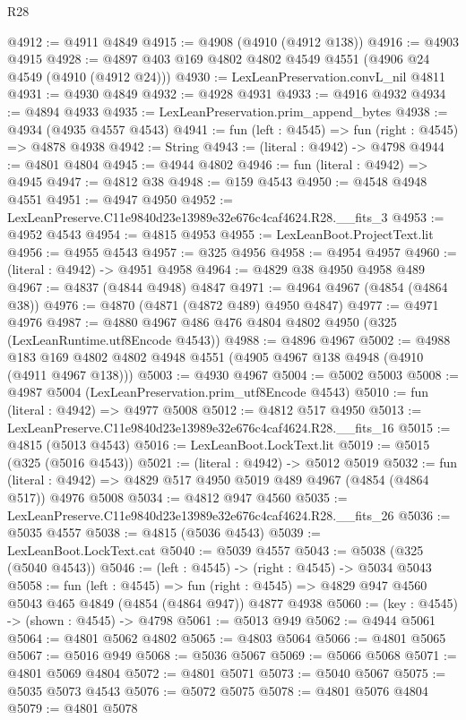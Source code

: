 \begin{lexlean}{R28}
\begin{coremodule}
@4912 := @4911 @4849
@4915 := @4908 (@4910 (@4912 @138))
@4916 := @4903 @4915
@4928 := @4897 @403 @169 @4802 @4802 @4549 @4551 (@4906 @24 @4549 (@4910 (@4912 @24)))
@4930 := LexLeanPreservation.convL_nil @4811
@4931 := @4930 @4849
@4932 := @4928 @4931
@4933 := @4916 @4932
@4934 := @4894 @4933
@4935 := LexLeanPreservation.prim_append_bytes
@4938 := @4934 (@4935 @4557 @4543)
@4941 := fun (left : @4545) => fun (right : @4545) => @4878 @4938
@4942 := String
@4943 := (literal : @4942) -> @4798
@4944 := @4801 @4804
@4945 := @4944 @4802
@4946 := fun (literal : @4942) => @4945
@4947 := @4812 @38
@4948 := @159 @4543
@4950 := @4548 @4948 @4551
@4951 := @4947 @4950
@4952 := LexLeanPreserve.C11e9840d23e13989e32e676c4caf4624.R28.__fits_3
@4953 := @4952 @4543
@4954 := @4815 @4953
@4955 := LexLeanBoot.ProjectText.lit
@4956 := @4955 @4543
@4957 := @325 @4956
@4958 := @4954 @4957
@4960 := (literal : @4942) -> @4951 @4958
@4964 := @4829 @38 @4950 @4958 @489
@4967 := @4837 (@4844 @4948) @4847
@4971 := @4964 @4967 (@4854 (@4864 @38))
@4976 := @4870 (@4871 (@4872 @489) @4950 @4847)
@4977 := @4971 @4976
@4987 := @4880 @4967 @486 @476 @4804 @4802 @4950 (@325 (LexLeanRuntime.utf8Encode @4543))
@4988 := @4896 @4967
@5002 := @4988 @183 @169 @4802 @4802 @4948 @4551 (@4905 @4967 @138 @4948 (@4910 (@4911 @4967 @138)))
@5003 := @4930 @4967
@5004 := @5002 @5003
@5008 := @4987 @5004 (LexLeanPreservation.prim_utf8Encode @4543)
@5010 := fun (literal : @4942) => @4977 @5008
@5012 := @4812 @517 @4950
@5013 := LexLeanPreserve.C11e9840d23e13989e32e676c4caf4624.R28.__fits_16
@5015 := @4815 (@5013 @4543)
@5016 := LexLeanBoot.LockText.lit
@5019 := @5015 (@325 (@5016 @4543))
@5021 := (literal : @4942) -> @5012 @5019
@5032 := fun (literal : @4942) => @4829 @517 @4950 @5019 @489 @4967 (@4854 (@4864 @517)) @4976 @5008
@5034 := @4812 @947 @4560
@5035 := LexLeanPreserve.C11e9840d23e13989e32e676c4caf4624.R28.__fits_26
@5036 := @5035 @4557
@5038 := @4815 (@5036 @4543)
@5039 := LexLeanBoot.LockText.cat
@5040 := @5039 @4557
@5043 := @5038 (@325 (@5040 @4543))
@5046 := (left : @4545) -> (right : @4545) -> @5034 @5043
@5058 := fun (left : @4545) =>
  fun (right : @4545) => @4829 @947 @4560 @5043 @465 @4849 (@4854 (@4864 @947)) @4877 @4938
@5060 := (key : @4545) -> (shown : @4545) -> @4798
@5061 := @5013 @949
@5062 := @4944 @5061
@5064 := @4801 @5062 @4802
@5065 := @4803 @5064
@5066 := @4801 @5065
@5067 := @5016 @949
@5068 := @5036 @5067
@5069 := @5066 @5068
@5071 := @4801 @5069 @4804
@5072 := @4801 @5071
@5073 := @5040 @5067
@5075 := @5035 @5073 @4543
@5076 := @5072 @5075
@5078 := @4801 @5076 @4804
@5079 := @4801 @5078

\end{coremodule}
\end{lexlean}
